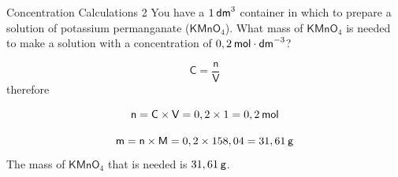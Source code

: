       \begin{wex}{Concentration Calculations 2 }
{
You have a $1\phantom{\rule{2pt}{0ex}}{\mathsf{dm}}^{3}$ container in which to prepare a solution of potassium permanganate ($\mathsf{KMnO}{}_{4}$). What mass of $\mathsf{KMnO}{}_{4}$ is needed to make a solution with a concentration of $0,2\phantom{\rule{2pt}{0ex}}\mathsf{mol}\cdot \mathsf{dm}^{-3}$? 
      \vspace{5pt}}
{
      \label{m38712*id283297}\nopagebreak\noindent{}
        
    \begin{equation*}
    \mathsf{C}=\frac{\mathsf{n}}{\mathsf{V}}
      \end{equation*}
      \label{m38712*id283318}therefore
      \label{m38712*id283321}\nopagebreak\noindent{}
        
    \begin{equation*}
    \mathsf{n}=\mathsf{C}\ensuremath{\times}\mathsf{V}=0,2\ensuremath{\times}1=0,2\phantom{\rule{2pt}{0ex}}\mathsf{mol}
      \end{equation*}
      \label{m38712*id283387}\nopagebreak\noindent{}
        
    \begin{equation*}
    \mathsf{m}=\mathsf{n}\ensuremath{\times}\mathsf{M}=0,2\ensuremath{\times}158,04=31,61\phantom{\rule{2pt}{0ex}}\mathsf{g}
      \end{equation*}
      \label{m38712*id283435}The mass of $\mathsf{KMnO}{}_{4}$ that is needed is $31,61\phantom{\rule{2pt}{0ex}}\mathsf{g}$.
 
}
    \end{wex}
    \noindent
\label{m38712*secfhsst!!!underscore!!!id1795}\vspace{-2cm} 

